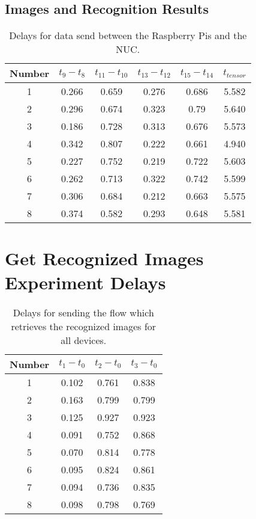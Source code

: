 \begin{appendices}
\subsection{Images and Recognition Results}
\begin{table}[!ht]
	\centering
\begin{tabular}{ c | c | c| c | c| c }	\toprule
 Number &$t_9 - t_8$  & $t_{11} - t_{10}$  & $t_{13}-t_{12}$ & $t_{15}-t_{14}$&  $t_{tensor}$ \\ \midrule
1&	0.266&	0.659&	0.276&	0.686&	5.582\\
2&	0.296&	0.674&	0.323&	0.79&	5.640\\
3&	0.186&	0.728&	0.313&	0.676&	5.573\\
4&	0.342&	0.807&	0.222&	0.661&	4.940\\
5&	0.227&	0.752&	0.219&	0.722&	5.603\\
6&	0.262&	0.713&	0.322&	0.742&	5.599\\
7&	0.306&	0.684&	0.212&	0.663&	5.575\\
8&	0.374&	0.582&	0.293&	0.648&	5.581\\
\end{tabular}
\caption{Delays for data send between the Raspberry Pis and the NUC.}
\label{table:data-results}
\end{table}


\section{Get Recognized Images Experiment Delays}\label{app:images}
\begin{table}[!ht]
	\centering
\begin{tabular}{ c | c | c| c }	\toprule
Number &$t_1 - t_0$  & $t_2 - t_0$  & $t_3-t_0$ \\ \midrule
1&	0.102&	0.761&	0.838\\
2&	0.163&	0.799&	0.799\\
3&	0.125&	0.927&	0.923\\
4&	0.091&	0.752&	0.868\\
5&	0.070&	0.814&	0.778\\
6&	0.095&	0.824&	0.861\\
7& 0.094&	0.736&	0.835\\
8&	0.098&	0.798&	0.769\\	
\end{tabular}
\caption{Delays for sending the flow which retrieves the recognized images for all devices.}
\label{table:images}
\end{table}

\end{appendices}

